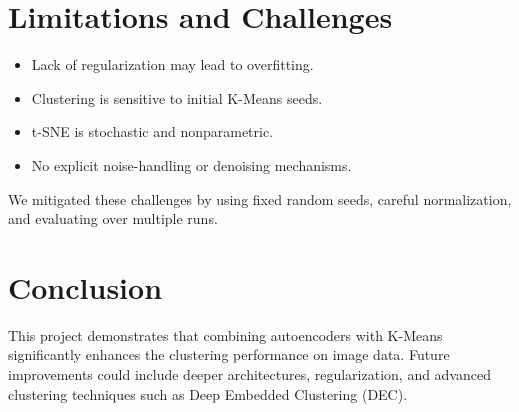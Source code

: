 \documentclass[conference]{IEEEtran}
\begin{document}
\section{Limitations and Challenges}
\begin{itemize}
    \item Lack of regularization may lead to overfitting.
    \item Clustering is sensitive to initial K-Means seeds.
    \item t-SNE is stochastic and nonparametric.
    \item No explicit noise-handling or denoising mechanisms.
\end{itemize}

We mitigated these challenges by using fixed random seeds, careful normalization, and evaluating over multiple runs.

\section{Conclusion}
This project demonstrates that combining autoencoders with K-Means significantly enhances the clustering performance on image data. Future improvements could include deeper architectures, regularization, and advanced clustering techniques such as Deep Embedded Clustering (DEC).



\end{document}
